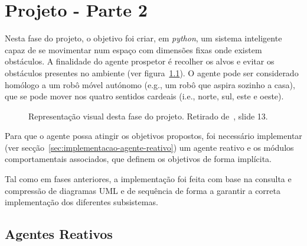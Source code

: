 \chapter{Projeto - Parte 2}\label{ch:projeto-parte2}

Nesta fase do projeto, o objetivo foi criar, em \textit{python}, um sistema inteligente capaz de se movimentar num espaço com dimensões fixas onde existem obstáculos.
A finalidade do agente prospetor é recolher os alvos e evitar os obstáculos presentes no ambiente (ver figura~\ref{fig:agente-prospetor}).
O agente pode ser considerado homólogo a um robô móvel autónomo (e.g., um robô que aspira sozinho a casa), que se pode mover nos quatro sentidos cardeais (i.e., norte, sul, este e oeste).

\begin{figure}[H]
    \begin{center}
    \end{center}
    \caption{Representação visual desta fase do projeto.
    Retirado de~\cite{isel:iasa:slides:arq-agentes-reativos-parte-2}, slide 13.}\label{fig:agente-prospetor}
\end{figure}

Para que o agente possa atingir os objetivos propostos, foi necessário implementar (ver secção~\ref{sec:implementacao-agente-reativo}) um agente reativo e os módulos comportamentais associados, que definem os objetivos de forma implícita.

Tal como em fases anteriores, a implementação foi feita com base na consulta e compressão de diagramas UML e de sequência de forma a garantir a correta implementação dos diferentes subsistemas.


\section{Agentes Reativos}\label{sec:agentes-reativos}

